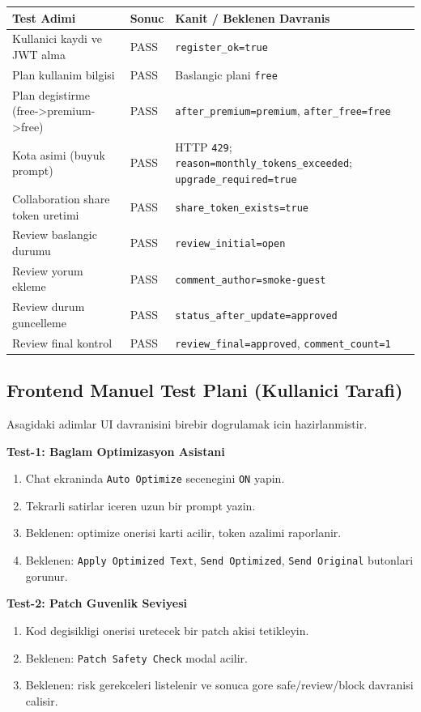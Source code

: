 \documentclass[12pt,a4paper]{article}
\begin{document}
\begin{longtable}{@{} P{4.4cm} P{3.0cm} P{6.8cm} @{} }
\toprule
Test Adimi & Sonuc & Kanit / Beklenen Davranis \\
\midrule
Kullanici kaydi ve JWT alma & PASS & \texttt{register\_ok=true} \\
Plan kullanim bilgisi & PASS & Baslangic plani \texttt{free} \\
Plan degistirme (free->premium->free) & PASS & \texttt{after\_premium=premium}, \texttt{after\_free=free} \\
Kota asimi (buyuk prompt) & PASS & HTTP \texttt{429}; \texttt{reason=monthly\_tokens\_exceeded}; \texttt{upgrade\_required=true} \\
Collaboration share token uretimi & PASS & \texttt{share\_token\_exists=true} \\
Review baslangic durumu & PASS & \texttt{review\_initial=open} \\
Review yorum ekleme & PASS & \texttt{comment\_author=smoke-guest} \\
Review durum guncelleme & PASS & \texttt{status\_after\_update=approved} \\
Review final kontrol & PASS & \texttt{review\_final=approved}, \texttt{comment\_count=1} \\
\bottomrule
\end{longtable}

\subsection{Frontend Manuel Test Plani (Kullanici Tarafi)}
Asagidaki adimlar UI davranisini birebir dogrulamak icin hazirlanmistir.

\textbf{Test-1: Baglam Optimizasyon Asistani}
\begin{enumerate}[leftmargin=*]
  \item Chat ekraninda \texttt{Auto Optimize} secenegini \texttt{ON} yapin.
  \item Tekrarli satirlar iceren uzun bir prompt yazin.
  \item Beklenen: optimize onerisi karti acilir, token azalimi raporlanir.
  \item Beklenen: \texttt{Apply Optimized Text}, \texttt{Send Optimized}, \texttt{Send Original} butonlari gorunur.
\end{enumerate}

\textbf{Test-2: Patch Guvenlik Seviyesi}
\begin{enumerate}[leftmargin=*]
  \item Kod degisikligi onerisi uretecek bir patch akisi tetikleyin.
  \item Beklenen: \texttt{Patch Safety Check} modal acilir.
  \item Beklenen: risk gerekceleri listelenir ve sonuca gore safe/review/block davranisi calisir.
\end{enumerate}
\end{document}

